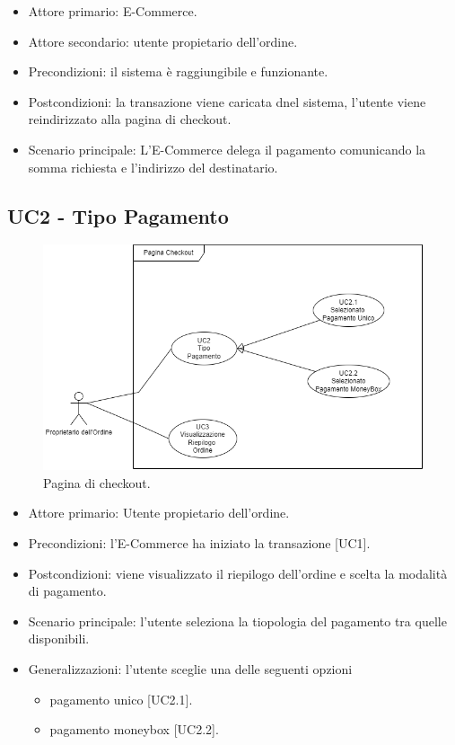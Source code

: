 \begin{itemize}
    \item Attore primario: E-Commerce.
    \item Attore secondario: utente propietario dell'ordine.
    \item Precondizioni: il sistema è raggiungibile e funzionante.
    \item Postcondizioni: la transazione viene caricata dnel sistema, l'utente viene reindirizzato alla pagina di checkout.
    \item Scenario principale: L'E-Commerce delega il pagamento comunicando la somma richiesta e l'indirizzo del destinatario.
\end{itemize}

\subsection{UC2 - Tipo Pagamento}

    \begin{figure}[H]
    \centering
    \includegraphics[scale=0.7]{immagini/UseCases-UC2-1.png}
    \caption{Pagina di checkout.}
  \end{figure}

    \begin{itemize}
    \item Attore primario: Utente propietario dell'ordine.
    \item Precondizioni: l'E-Commerce ha iniziato la transazione [UC1].
    \item Postcondizioni: viene visualizzato il riepilogo dell'ordine e scelta la modalità di pagamento.
    \item Scenario principale: l'utente seleziona la tiopologia del pagamento tra quelle disponibili.
    \item Generalizzazioni: l'utente sceglie una delle seguenti opzioni\begin{itemize}
        \item pagamento unico [UC2.1].
        \item pagamento moneybox [UC2.2].
    \end{itemize}
    \end{itemize}
    \clearpage

